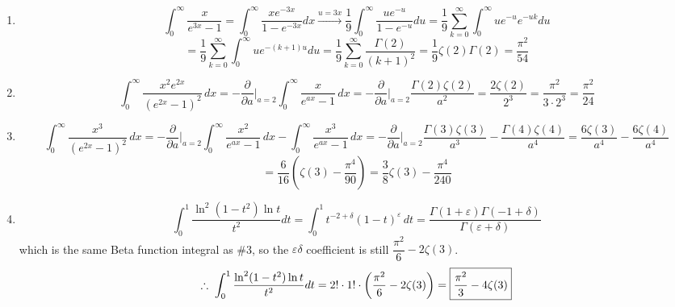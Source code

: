 \documentclass{article}
\begin{document}
\begin{enumerate}
Since the $\delta^0$ coefficient is $ 2\sqrt{3\pi}$, the integral is \boxed{2\sqrt{3\pi}}.

\item \[\int_{0}^{\infty}\frac x {e^{3x}-1} = \int_0^\infty \frac{x e^{-3x}}{1-e^{-3x}} dx \xrightarrow{u=3x} \frac{1}{9}\int_0^\infty \frac{ue^{-u}}{1-e^{-u}} du = \frac{1}{9}\sum_{k=0}^\infty \int_0^\infty ue^{-u}e^{-uk} du\]
\[=\frac{1}{9} \sum_{k=0}^\infty \int_0^\infty u e^{-(k+1)u} du = \frac{1}{9} \sum_{k=0}^\infty \frac{\Gamma(2)}{(k+1)^2} = \frac{1}{9}\zeta(2)\Gamma(2) = \boxed{\frac{\pi^2}{54}}\]

\item 
\[
\int_0^\infty \frac{x^2 e^{2x}}{(e^{2x}-1)^2}\,dx 
= -\frac{\partial}{\partial a}\bigg|_{a=2}\int_0^\infty \frac{x}{e^{ax}-1}\,dx 
= -\frac{\partial}{\partial a}\bigg|_{a=2}\frac{\Gamma(2)\zeta(2)}{a^2} 
= \frac{2\zeta(2)}{2^3} = \frac{\pi^2}{3\cdot 2^3} = \boxed{\dfrac{\pi^2}{24}}
\]

\item 
\[
\int_0^\infty \frac{x^3}{(e^{2x}-1)^2}\,dx 
= -\frac{\partial}{\partial a}\bigg|_{a=2}\int_0^\infty \frac{x^2}{e^{ax}-1}\,dx - \int_0^\infty\frac{x^3}{e^{ax}-1}\,dx
= -\frac{\partial}{\partial a}\bigg|_{a=2}\frac{\Gamma(3)\zeta(3)}{a^3} - \frac{\Gamma(4)\zeta(4)}{a^4}
= \frac{6\zeta(3)}{a^4} - \frac{6\zeta(4)}{a^4}
\]\[= \frac{6}{16}\!\left(\zeta(3) - \frac{\pi^4}{90}\right) = \boxed{\frac{3}{8}\zeta(3) - \frac{\pi^4}{240}}
\]

\item \[\int_0^1 \frac{\ln^2(1-t^2)\ln t}{t^2}dt = \int_0^1 t^{-2+\delta}(1-t)^\varepsilon\,dt = \frac{\Gamma(1+\varepsilon)\Gamma(-1+\delta)}{\Gamma(\varepsilon+\delta)}\]
which is the same Beta function integral as \#3, so the $\varepsilon\delta$ coefficient is still $\dfrac{\pi^2}{6} - 2\zeta(3)$. 
\[
\therefore \hspace{1mm}\int_0^1 \frac{\ln^2(1-t^2)\ln t}{t^2}dt = 2!\cdot 1!\cdot\left(\frac{\pi^2}{6} - 2\zeta(3)\right) = \boxed{\frac{\pi^2}{3} - 4\zeta(3)}
\]
\end{enumerate}
\end{document}
